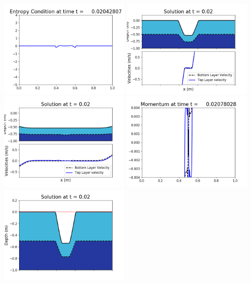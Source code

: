 \documentclass[11pt]{article}
\begin{document}
\vskip 10pt 
\includegraphics[width=0.475\textwidth]{frame0059fig1009.png}
\vskip 10pt 
\includegraphics[width=0.475\textwidth]{frame0060fig1001.png}
\includegraphics[width=0.475\textwidth]{frame0060fig1002.png}
\vskip 10pt 
\includegraphics[width=0.475\textwidth]{frame0060fig1003.png}
\includegraphics[width=0.475\textwidth]{frame0060fig1006.png}
\end{document}
